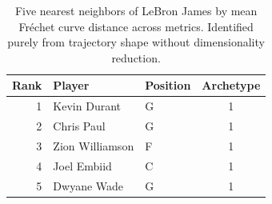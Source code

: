 \begin{table}[htbp]
  \centering\small
  \begin{tabular}{rllc}
    \toprule
    Rank & Player & Position & Archetype \\
    \midrule
    1 & Kevin Durant & G & 1 \\
    2 & Chris Paul & G & 1 \\
    3 & Zion Williamson & F & 1 \\
    4 & Joel Embiid & C & 1 \\
    5 & Dwyane Wade & G & 1 \\
    \bottomrule
  \end{tabular}
  \caption{Five nearest neighbors of LeBron James by mean Fr\'{e}chet curve distance across metrics. Identified purely from trajectory shape without dimensionality reduction.}
  \label{tab:LeBron_James_frechet_curve_neighbors}
\end{table}

